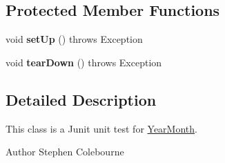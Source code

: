 \subsection*{Protected Member Functions}
\begin{DoxyCompactItemize}
\item 
\hypertarget{classorg_1_1joda_1_1time_1_1_test_year_month___constructors_ae03126c945f22870389422339675cd83}{void {\bfseries set\-Up} ()  throws Exception }\label{classorg_1_1joda_1_1time_1_1_test_year_month___constructors_ae03126c945f22870389422339675cd83}

\item 
\hypertarget{classorg_1_1joda_1_1time_1_1_test_year_month___constructors_afae67001126b7689dd7dd7f514816d2e}{void {\bfseries tear\-Down} ()  throws Exception }\label{classorg_1_1joda_1_1time_1_1_test_year_month___constructors_afae67001126b7689dd7dd7f514816d2e}

\end{DoxyCompactItemize}


\subsection{Detailed Description}
This class is a Junit unit test for \hyperlink{classorg_1_1joda_1_1time_1_1_year_month}{Year\-Month}.

\begin{DoxyAuthor}{Author}
Stephen Colebourne 
\end{DoxyAuthor}


